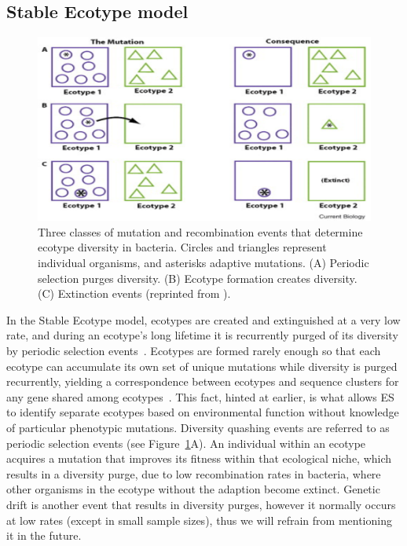 \subsection*{Stable Ecotype model}

\begin{figure}[h!]
 \centering
 \label{fig:StableEvents}
 \includegraphics{images/StableEcotypeEvents-CH2}
 \caption[Events predicted by the Stable Ecotype model.]{Three classes of mutation and recombination events that determine ecotype diversity in bacteria. Circles and triangles represent individual organisms, and asterisks adaptive mutations. (A) Periodic selection purges diversity. (B) Ecotype formation creates diversity. (C) Extinction events (reprinted from \protect\cite{cohan2007systematics}).}
 \label{fig:StableEvents}
\end{figure}

In the Stable Ecotype model, ecotypes are created and extinguished at a very low rate, and during an ecotype's long lifetime it is recurrently purged of its diversity by periodic selection events~\cite{cohan2007systematics}.
Ecotypes are formed rarely enough so that each ecotype can accumulate its own set of unique mutations while diversity is purged recurrently, yielding a correspondence between ecotypes and sequence clusters for any gene shared among ecotypes~\cite{cohan2008origins}.
This fact, hinted at earlier, is what allows ES to identify separate ecotypes based on environmental function without knowledge of particular phenotypic mutations.
Diversity quashing events are referred to as periodic selection events (see Figure~\ref{fig:StableEvents}A).
An individual within an ecotype acquires a mutation that improves its fitness within that ecological niche, which results in a diversity purge, due to low recombination rates in bacteria, where other organisms in the ecotype without the adaption become extinct.
Genetic drift is another event that results in diversity purges, however it normally occurs at low rates (except in small sample sizes), thus we will refrain from mentioning it in the future.

